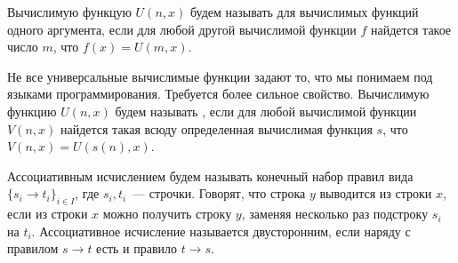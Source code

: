




\setcounter{curtask}{21}


\begin{definition*}
    Вычислимую функцую $U(n, x)$ будем называть  для вычислимых
    функций одного аргумента, если для любой другой вычислимой функции $f$ найдется такое число $m$, что
    $f(x) = U(m, x)$.

    Не все универсальные вычислимые функции задают то, что мы понимаем под языками
    программирования. Требуется более сильное свойство. Вычислимую функцию $U(n, x)$ будем называть
    , если для любой вычислимой функции $V(n, x)$ найдется такая всюду
    определенная вычислимая функция $s$, что $V(n, x) = U(s(n), x)$.
\end{definition*}


\begin{definition*}
    Ассоциативным исчислением будем называть конечный набор правил вида $\{s_i \to t_i\}_{i \in I}$, где
    $s_i, t_i$~--- строчки. Говорят, что строка $y$ выводится из строки $x$, если из строки $x$ можно
    получить строку $y$, заменяя несколько раз подстроку $s_i$ на $t_i$. Ассоциативное исчисление
    называется двусторонним, если наряду с правилом $s \to t$ есть и правило $t \to s$.
\end{definition*}



\breakline



